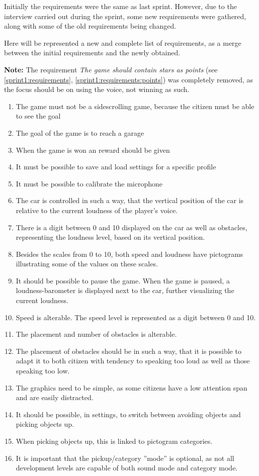 Initially the requirements were the same as last sprint.
However, due to the interview carried out during the sprint, some new requirements were gathered, along with some of the old requirements being changed.

Here will be represented a new and complete list of requirements, as a merge between the initial requirements and the newly obtained.

\textbf{Note:} The requirement \textit{The game should contain stars as points} (see \cref{sprint1:requirements}, \cref{sprint1:requirements:points}) was completely removed, as the focus should be on using the voice, not winning as such.

\begin{enumerate}
\item The game must not be a sidescrolling game, because the citizen must be able to see the goal
\item The goal of the game is to reach a garage
\item When the game is won an reward should be given
\item It must be possible to save and load settings for a specific profile
\item It must be possible to calibrate the microphone 
\item \label{carcontrolReq} The car is controlled in such a way, that the vertical position of the car is relative to the current loudness of the player's voice.
\item There is a digit between 0 and 10 displayed on the car as well as obstacles, representing the loudness level, based on its vertical position. 
\item Besides the scales from 0 to 10, both speed and loudness have pictograms illustrating some of the values on these scales.
\item It should be possible to pause the game. When the game is paused, a loudness-barometer is displayed next to the car, further visualizing the current loudness.
\item Speed is alterable. The speed level is represented as a digit between 0 and 10.
\item The placement and number of obstacles is alterable.
\item The placement of obstacles should be in such a way, that it is possible to adapt it to both citizen with tendency to speaking too loud as well as those speaking too low.
\item \label{graphicsReq} The graphics need to be simple, as some citizens have a low attention span and are easily distracted.
\item It should be possible, in settings, to switch between avoiding objects and picking objects up.
\item When picking objects up, this is linked to pictogram categories.
\item It is important that the pickup/category ''mode'' is optional, as not all development levels are capable of both sound mode and category mode.
\end{enumerate}